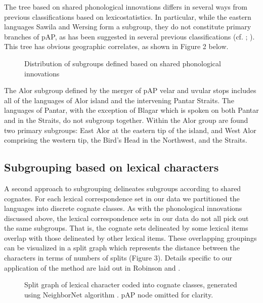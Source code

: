 The tree based on shared phonological innovations differs in several ways from previous classifications based on lexicostatistics. In particular, while the eastern languages Sawila and Wersing form a subgroup, they do not constitute primary branches of pAP, as has been suggested in several previous classifications (cf. \citet{Wurm1982}; \citet{Lewis2009}). This tree has obvious geographic correlates, as shown in Figure 2 below.

\begin{figure}
\caption{Distribution of subgroups defined based on shared phonological innovations}
\end{figure}

The Alor subgroup defined by the merger of pAP velar and uvular stops includes all of the languages of Alor island and the intervening Pantar Straits. The languages of Pantar, with the exception of Blagar which is spoken on both Pantar and in the Straits, do not subgroup together. Within the Alor group are found two primary subgroups: East Alor at the eastern tip of the island, and West Alor comprising the western tip, the Bird's Head in the Northwest, and the Straits.

\subsection{ Subgrouping based on lexical characters}
A second approach to subgrouping delineates subgroups according to shared cognates. For each lexical correspondence set in our data we partitioned the languages into discrete cognate classes. As with the phonological innovations discussed above, the lexical correspondence sets in our data do not all pick out the same subgroups. That is, the cognate sets delineated by some lexical items overlap with those delineated by other lexical items. These overlapping groupings can be visualized in a split graph which represents the distance between the characters in terms of numbers of splits (Figure 3). Details specific to our application of the method are laid out in Robinson and \citet{Holton2012}.

\begin{figure}
\caption{Split graph of lexical character coded into cognate classes, generated using NeighborNet algorithm  \citep{HusonEtAl2006}. pAP node omitted for clarity.}
\label{bkm:Ref317159090}
\end{figure}

